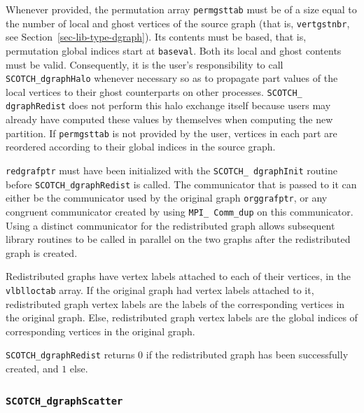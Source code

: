\begin{itemize}
Whenever provided, the permutation array {\tt perm\lbt gst\lbt tab}
must be of a size equal to the number of local and ghost vertices of
the source graph (that is, {\tt vert\lbt gst\lbt nbr}, see
Section~\ref{sec-lib-type-dgraph}). Its contents must be based, that
is, permutation global indices start at {\tt baseval}. Both its local
and ghost contents must be valid. Consequently, it is the user's
responsibility to call {\tt SCOTCH\_dgraph\lbt Halo} whenever
necessary so as to propagate part values of the local vertices to
their ghost counterparts on other processes. {\tt SCOTCH\_\lbt
dgraph\lbt Redist} does not perform this halo exchange itself
because users may already have computed these values by themselves
when computing the new partition. If {\tt perm\lbt gst\lbt tab} is not
provided by the user, vertices in each part are reordered according to
their global indices in the source graph.

{\tt redgrafptr} must have been initialized with the {\tt SCOTCH\_\lbt
dgraph\lbt Init} routine before {\tt SCOTCH\_dgraph\lbt Redist} is
called. The communicator that is passed to it can either be the
communicator used by the original graph {\tt org\lbt graf\lbt ptr},
or any congruent communicator created by using {\tt MPI\_\lbt
Comm\_\lbt dup} on this communicator. Using a distinct communicator
for the redistributed graph allows subsequent library routines to be
called in parallel on the two graphs after the redistributed graph is
created.

Redistributed graphs have vertex labels attached to each of their
vertices, in the {\tt vlbl\lbt loc\lbt tab} array. If the original
graph had vertex labels attached to it, redistributed graph vertex
labels are the labels of the corresponding vertices in the original
graph. Else, redistributed graph vertex labels are the global indices
of corresponding vertices in the original graph.

\progret

{\tt SCOTCH\_dgraphRedist} returns $0$ if the redistributed graph has
been successfully created, and $1$ else.
\end{itemize}

\subsubsection{{\tt SCOTCH\_dgraphScatter}}

